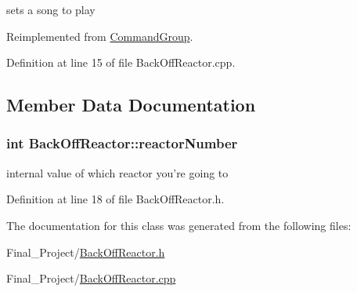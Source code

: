 sets a song to play 



Reimplemented from \hyperlink{classCommandGroup_a99800c5dbd05ab750aa0bb27518d0467}{Command\-Group}.



Definition at line 15 of file Back\-Off\-Reactor.\-cpp.



\subsection{Member Data Documentation}
\hypertarget{classBackOffReactor_ae5b8f5714a059f48405fd6ab7b3de851}{
\subsubsection[{reactor\-Number}]{\setlength{\rightskip}{0pt plus 5cm}int Back\-Off\-Reactor\-::reactor\-Number\hspace{0.3cm}{\ttfamily [private]}}}\label{classBackOffReactor_ae5b8f5714a059f48405fd6ab7b3de851}


internal value of which reactor you're going to 



Definition at line 18 of file Back\-Off\-Reactor.\-h.



The documentation for this class was generated from the following files\-:\begin{DoxyCompactItemize}
\item 
Final\-\_\-\-Project/\hyperlink{BackOffReactor_8h}{Back\-Off\-Reactor.\-h}\item 
Final\-\_\-\-Project/\hyperlink{BackOffReactor_8cpp}{Back\-Off\-Reactor.\-cpp}\end{DoxyCompactItemize}
